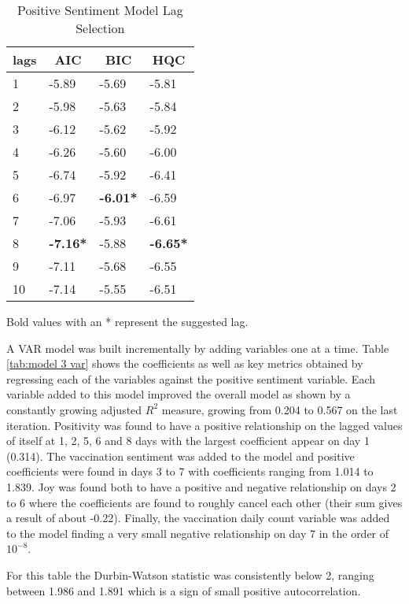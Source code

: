 \begin{table}[H]
\centering
\begin{tabular}{@{}llll@{}}
\toprule
\multicolumn{1}{c}{\textbf{lags}} & \multicolumn{1}{c}{\textbf{AIC}} & \multicolumn{1}{c}{\textbf{BIC}} & \multicolumn{1}{c}{\textbf{HQC}} \\ \midrule
1 & -5.89 & -5.69 & -5.81 \\
2 & -5.98 & -5.63 & -5.84 \\
3 & -6.12 & -5.62 & -5.92 \\
4 & -6.26 & -5.60 & -6.00 \\
5 & -6.74 & -5.92 & -6.41 \\
6 & -6.97 & \textbf{-6.01*} & -6.59 \\
7 & -7.06 & -5.93 & -6.61 \\
8 & \textbf{-7.16*} & -5.88 & \textbf{-6.65*} \\
9 & -7.11 & -5.68 & -6.55 \\
10 & -7.14 & -5.55 & -6.51 \\ \bottomrule
\end{tabular}
\caption{Positive Sentiment Model Lag Selection}
Bold values with an * represent the suggested lag.
\label{tab:model 3 lag}
\end{table}
 
A VAR model was built incrementally by adding variables one at a time. Table \ref{tab:model 3 var} shows the coefficients as well as key metrics obtained by regressing each of the variables against the positive sentiment variable. Each variable added to this model improved the overall model as shown by a constantly growing adjusted $R^2$ measure, growing from 0.204 to 0.567 on the last iteration. Positivity was found to have a positive relationship on the lagged values of itself at 1, 2, 5, 6 and 8 days with the largest coefficient appear on day 1 (0.314). The vaccination sentiment was added to the model and positive coefficients were found in days 3 to 7 with coefficients ranging from 1.014 to 1.839. Joy was found both to have a positive and negative relationship on days 2 to 6 where the coefficients are found to roughly cancel each other (their sum gives a result of about -0.22). Finally, the vaccination daily count variable was added to the model finding a very small negative relationship on day 7 in the order of $10^{-8}$.

For this table the Durbin-Watson statistic was consistently below 2, ranging between 1.986 and 1.891 which is a sign of small positive autocorrelation.

